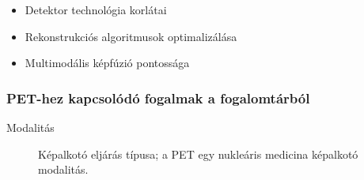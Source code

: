 \documentclass[a4paper,12pt]{article}
\begin{document}
\begin{itemize}
\begin{itemize} \item Detektor technológia korlátai \item Rekonstrukciós algoritmusok optimalizálása \item Multimodális képfúzió pontossága \end{itemize}
\end{itemize}

\subsubsection{PET-hez kapcsolódó fogalmak a fogalomtárból} 

\begin{description} \item[Modalitás] Képalkotó eljárás típusa; a PET egy nukleáris medicina képalkotó modalitás.


\end{description}
\end{document}
